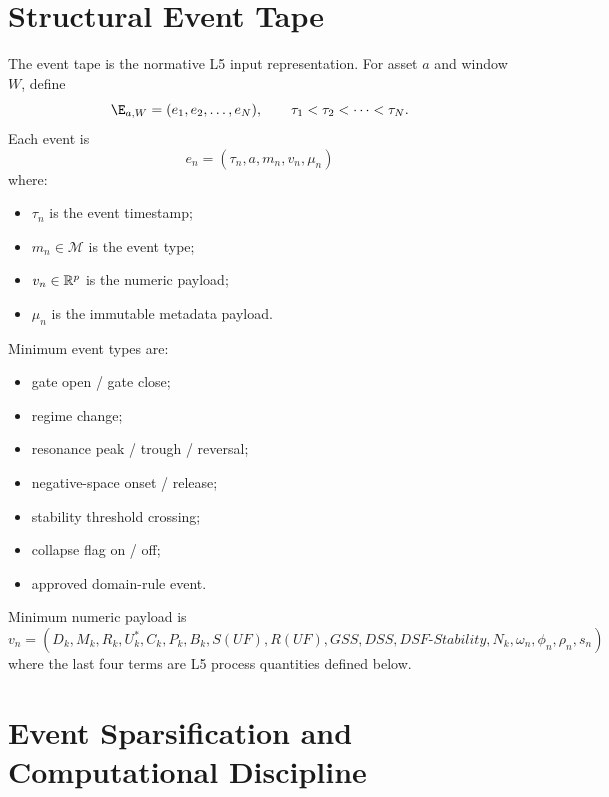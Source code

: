 \section{Structural Event Tape}

The event tape is the normative L5 input representation. For asset $a$ and window $W$, define
\[
\E_{a,W}=(e_1,e_2,\dots,e_N),\qquad \tau_1<\tau_2<\cdots<\tau_N.
\]
Each event is
\[
e_n=(\tau_n,a,m_n,v_n,\mu_n)
\]
where:
\begin{itemize}
    \item $\tau_n$ is the event timestamp;
    \item $m_n\in\mathcal{M}$ is the event type;
    \item $v_n\in\mathbb{R}^{p}$ is the numeric payload;
    \item $\mu_n$ is the immutable metadata payload.
\end{itemize}

Minimum event types are:
\begin{itemize}
    \item gate open / gate close;
    \item regime change;
    \item resonance peak / trough / reversal;
    \item negative-space onset / release;
    \item stability threshold crossing;
    \item collapse flag on / off;
    \item approved domain-rule event.
\end{itemize}

Minimum numeric payload is
\[
v_n = (D_k,M_k,R_k,U_k^{\ast},C_k,P_k,B_k,S(UF),R(UF),GSS,DSS,DSF\text{-}Stability,N_k,\omega_n,\phi_n,\rho_n,s_n)
\]
where the last four terms are L5 process quantities defined below.


\section{Event Sparsification and Computational Discipline}

